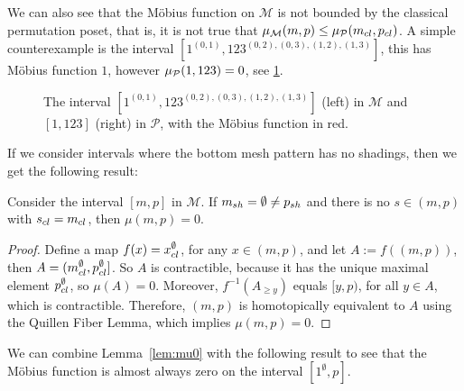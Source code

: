 \documentclass[11pt,a4paper,oneside]{article}
\begin{document}
We can also see that the M\"obius function on $\mathcal{M}$ is not bounded by
the classical permutation poset, that is, it is not true that $\operatorname{\mu_\mathcal{M}}(m,p)\le
\operatorname{\mu_\mathcal{P}}(m_{cl},p_{cl})$. A simple counterexample is the interval
$[1^{(0,1)},123^{(0,2),(0,3),(1,2),(1,3)}]$, this has M\"obius function $1$,
however $\operatorname{\mu_\mathcal{P}}(1,123)=0$, see \cref{fig:1-123}.

\begin{figure}\centering
{}
\caption{The interval $[1^{(0,1)},123^{(0,2),(0,3),(1,2),(1,3)}]$
(left) in $\mathcal{M}$ and $[1,123]$ (right) in $\mathcal{P}$, 
with the M\"obius function in red.}\label{fig:1-123}
\end{figure}

If we consider intervals where the bottom mesh pattern has no shadings, then we
get the following result:
\begin{lem}\label{lem:mu0}
Consider the interval $[m,p]$ in $\mathcal{M}$. If $m_{sh}=\emptyset\not=p_{sh}$
and there is no $s\in(m,p)$ with $s_{cl}=m_{cl}$, then $\mu(m,p)=0$.
\begin{proof}
Define a map $f(x)=x_{cl}^\emptyset$, for any $x\in(m,p)$, and let $A:=f((m,p))$, then $A=(m_{cl}^\emptyset,p_{cl}^{\emptyset}]$.
So  $A$ is contractible, because it has the
unique maximal element $p_{cl}^\emptyset$, so $\mu(A)=0$. Moreover, $f^{-1}(A_{\ge y})$
equals $[y,p)$, for all $y\in A$, which is contractible. Therefore, $(m,p)$ is homotopically equivalent
to $A$ using the Quillen Fiber Lemma, which implies $\mu(m,p)=0$.
\end{proof}
\end{lem}

We can combine Lemma~\ref{lem:mu0} with the following result to see that the
M\"obius function is almost always zero on the interval $[1^\emptyset,p]$.
\end{document}
